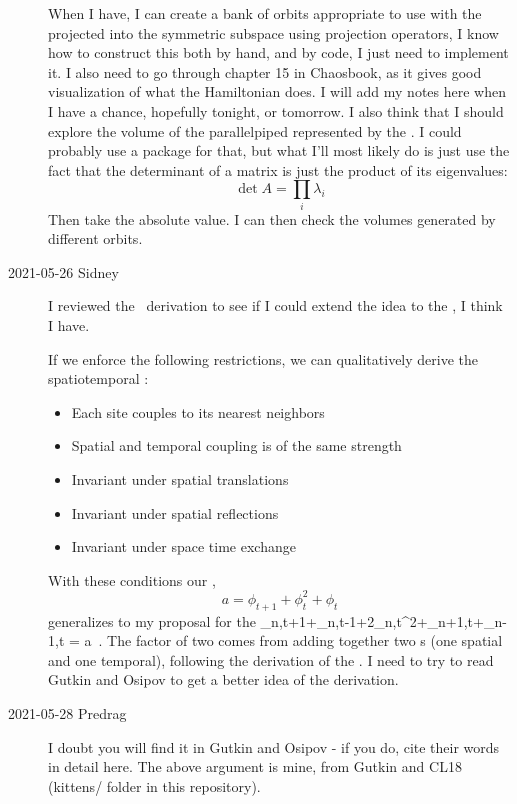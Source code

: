 \begin{description}
When I have, I can create a bank of orbits appropriate to use with the
{\jacobianOrb} projected into the symmetric subspace using projection
operators, I know how to construct this both by hand, and by code, I just
need to implement it. I also need to go through chapter 15 in Chaosbook, as
it gives good visualization of what the Hamiltonian {\HenonMap} does. I will
add my notes here when I have a chance, hopefully tonight, or tomorrow. I
also think that I should explore the volume of the parallelpiped represented
by the \jacobianOrb. I could probably use a package for that, but what I'll
most likely do is just use the fact that the determinant of a matrix is just
the product of its eigenvalues:
$$\det{A}=\prod_i\lambda_i$$
Then take the absolute value. I can then check the volumes generated by
different orbits.

\item[2021-05-26 Sidney]
I reviewed the \catlatt\ derivation to see if I could extend the idea to the
{\HenonMap}, I think I have.

If we enforce the following restrictions, we can qualitatively derive the
spatiotemporal {\HenonMap}:
\begin{itemize}
\item Each site couples to its nearest neighbors
\item Spatial and temporal coupling is of the same strength
\item Invariant under spatial translations
\item Invariant under spatial reflections
\item Invariant under space time exchange
\end{itemize}
With these conditions our {\henlatt}
, 
$$a=\phi_{t+1}+\phi_t^2+\phi_t$$
generalizes to my proposal for the {\henSTlatt}
\beq
\phi_{n,t+1}+\phi_{n,t-1}+2\phi_{n,t}^2+\phi_{n+1,t}+\phi_{n-1,t} = a
\,.
The factor of two comes from adding together two \HenonMap s (one spatial and
one temporal), following the derivation of the \catlatt. I need to try to
read Gutkin and Osipov  to get a better
idea of the derivation.

\item[2021-05-28 Predrag] I doubt you will find it in Gutkin and
    Osipov - if you do, cite their words in detail here. The
    above argument is mine, from Gutkin \etal{} and CL18 (kittens/ folder
    in this repository).


\end{description}
